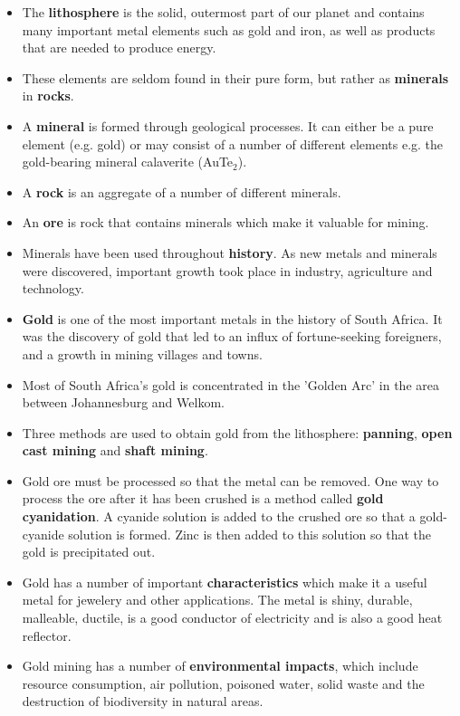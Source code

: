 
\begin{itemize}
\item{The \textbf{lithosphere} is the solid, outermost part of our planet and contains many important metal elements such as gold and iron, as well as products that are needed to produce energy.}
\item{These elements are seldom found in their pure form, but rather as \textbf{minerals} in \textbf{rocks}.}
\item{A \textbf{mineral} is formed through geological processes. It can either be a pure element (e.g. gold) or may consist of a number of different elements e.g. the gold-bearing mineral calaverite (AuTe$_{2}$).}
\item{A \textbf{rock} is an aggregate of a number of different minerals.}
\item{An \textbf{ore} is rock that contains minerals which make it valuable for mining.}
\item{Minerals have been used throughout \textbf{history}. As new metals and minerals were discovered, important growth took place in industry, agriculture and technology.}
\item{\textbf{Gold} is one of the most important metals in the history of South Africa. It was the discovery of gold that led to an influx of fortune-seeking foreigners, and a growth in mining villages and towns.}
\item{Most of South Africa's gold is concentrated in the 'Golden Arc' in the area between Johannesburg and Welkom.}
\item{Three methods are used to obtain gold from the lithosphere: \textbf{panning}, \textbf{open cast mining} and \textbf{shaft mining}.}
\item{Gold ore must be processed so that the metal can be removed. One way to process the ore after it has been crushed is a method called \textbf{gold cyanidation}. A cyanide solution is added to the crushed ore so that a gold-cyanide solution is formed. Zinc is then added to this solution so that the gold is precipitated out.}
\item{Gold has a number of important \textbf{characteristics} which make it a useful metal for jewelery and other applications. The metal is shiny, durable, malleable, ductile, is a good conductor of electricity and is also a good heat reflector.}
\item{Gold mining has a number of \textbf{environmental impacts}, which include resource consumption, air pollution, poisoned water, solid waste and the destruction of biodiversity in natural areas.}

\end{itemize}
